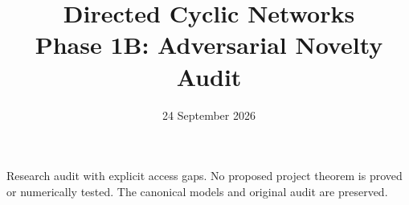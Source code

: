 \documentclass[11pt]{article}
\title{Directed Cyclic Networks\\Phase 1B: Adversarial Novelty Audit}
\author{}
\date{24 September 2026}
\begin{document}
\maketitle
\noindent Research audit with explicit access gaps. No proposed project theorem
is proved or numerically tested. The canonical models and original audit are preserved.
\tableofcontents
\clearpage

\clearpage

\clearpage


\end{document}
